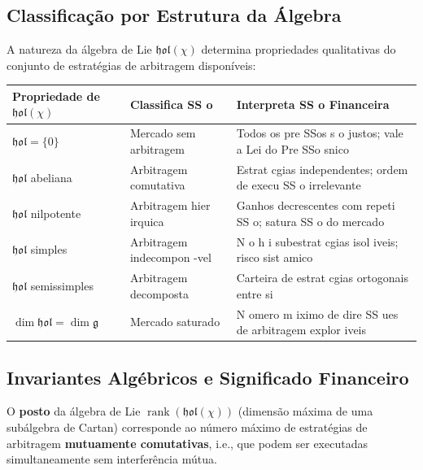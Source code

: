 \subsection{Classifica\c{c}\~ao por Estrutura da \'Algebra}

A natureza da \'algebra de Lie \(\mathfrak{hol}(\chi)\) determina propriedades qualitativas do conjunto de estrat\'egias de arbitragem dispon\'iveis:

\begin{center}
\begin{tabular}{@{}lll@{}}
\toprule
\textbf{Propriedade de \(\mathfrak{hol}(\chi)\)} & \textbf{Classifica SS o} & \textbf{Interpreta SS o Financeira} \\
\midrule
\(\mathfrak{hol} = \{0\}\) & Mercado sem arbitragem & Todos os pre SSos s o justos; vale a Lei do Pre SSo snico \\
\(\mathfrak{hol}\) abeliana & Arbitragem comutativa & Estrat cgias independentes; ordem de execu SS o irrelevante \\
\(\mathfrak{hol}\) nilpotente & Arbitragem hier irquica & Ganhos decrescentes com repeti SS o; satura SS o do mercado \\
\(\mathfrak{hol}\) simples & Arbitragem indecompon -vel & N o h i subestrat cgias isol iveis; risco sist amico \\
\(\mathfrak{hol}\) semissimples & Arbitragem decomposta & Carteira de estrat cgias ortogonais entre si \\
\(\dim \mathfrak{hol} = \dim \mathfrak{g}\) & Mercado saturado & N omero m iximo de dire SS ues de arbitragem explor iveis \\
\bottomrule
\end{tabular}
\end{center}

\subsection{Invariantes Alg\'ebricos e Significado Financeiro}

\begin{prop}
O \textbf{posto} da \'algebra de Lie \(\operatorname{rank}(\mathfrak{hol}(\chi))\) (dimens\~ao m\'axima de uma sub\'algebra de Cartan) corresponde ao n\'umero m\'aximo de estrat\'egias de arbitragem \textbf{mutuamente comutativas}, i.e., que podem ser executadas simultaneamente sem interfer\^encia m\'utua.
\end{prop}

